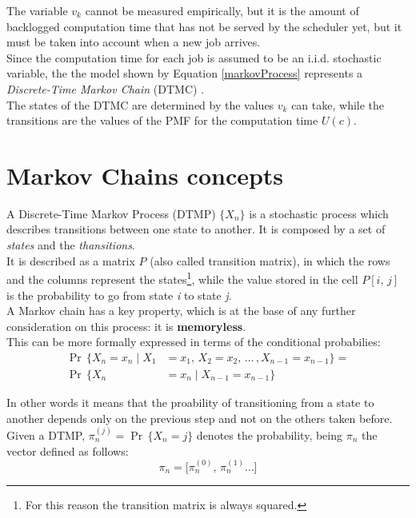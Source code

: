 The variable \( v_{k} \) cannot be measured empirically, but it is the amount of backlogged computation time that has not be served by the scheduler yet, but it must be taken into account when a new job arrives.\\
Since the computation time for each job is assumed to be an i.i.d. stochastic variable, the the model shown by Equation \ref{markovProcess} represents a \emph{Discrete-Time Markov Chain} (DTMC) \cite{probGuarantees} \cite{effRobustGuarantees}.\\
The states of the DTMC are determined by the values \( v_{k} \) can take, while the transitions are the values of the PMF for the computation time \( U(c) \).

\section{Markov Chains concepts}
A Discrete-Time Markov Process (DTMP) \( \{X_{n}\} \) is a stochastic process which describes transitions between one state to another. It is composed by a set of \emph{states} and the \emph{thansitions}.\\
%
%
It is described as a matrix \( P \) (also called transition matrix), in which the rows and the columns represent the states\footnote{For this reason the transition matrix is always squared.}, while the value stored in the cell \( P[i,\,j] \) is the probability to go from state \emph{i} to state \emph{j}.\\
A Markov chain has a key property, which is at the base of any further consideration on this process: it is \textbf{memoryless}.\\
This can be more formally expressed in terms of the conditional probabilies:
\begin{equation} \tag{3} \label{memoryless}
\begin{split}
  \Pr\,\{X_{n} = x_{n} \mid X_{1} &= x_{1},\,X_{2} = x_{2},\,\dots\,, X_{n-1} = x_{n-1} \} =\\
  \Pr\,\{X_{n} &= x_{n} \mid X_{n-1} = x_{n-1}  \}
\end{split}
\end{equation}

In other words it means that the proability of transitioning from a state to another depends only on the previous step and not on the others taken before.\\
Given a DTMP, \( \pi_{n}^{(j)} = \Pr\,\{X_{n} = j\}\) denotes the probability, being \( \pi_{n} \) the vector defined as follows:
\begin{equation*}
  \pi_{n} =  \big[\pi_{n}^{(0)},\,\pi_{n}^{(1)} \dots \big]
\end{equation*}

